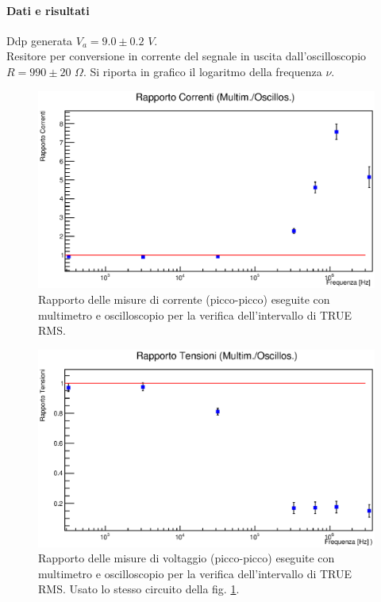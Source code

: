 {\paragraph{Dati e risultati}{
Ddp generata $V_{a}=9.0\pm0.2$ $V$.\\
Resitore per conversione in corrente del segnale in uscita dall'oscilloscopio $R=990\pm20$ $\Omega$. Si riporta in grafico il logaritmo della frequenza $\nu$.
%
    \begin{figure}[H]
        \centering
        \includegraphics[scale=.6]{Grafici/C2_P1_trueRMS_I.eps}
        \caption{
        Rapporto delle misure di corrente (picco-picco)
        eseguite con multimetro e oscilloscopio per la verifica dell'intervallo di TRUE RMS.
        }
        \label{fig:C2_P1_trueRMS_I}
    \end{figure}
    
    \begin{figure}[H]
        \centering
        \includegraphics[scale=.6]{Grafici/C2_P1_trueRMS_V.eps}
        \caption{
        Rapporto delle misure di voltaggio (picco-picco) eseguite con multimetro e oscilloscopio per la verifica dell'intervallo di TRUE RMS.
        Usato lo stesso circuito della fig. \ref{fig:C2_P1_trueRMS_I}.
        }
        \label{fig:C2_P1_trueRMS_V}
    \end{figure}
    
}}
